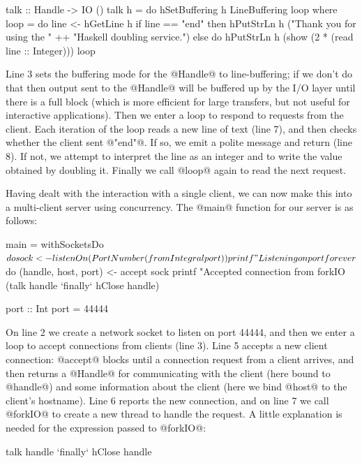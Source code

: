 \begin{numhaskell}
talk :: Handle -> IO ()
talk h = do
  hSetBuffering h LineBuffering
  loop
 where
  loop = do
    line <- hGetLine h
    if line == "end"
       then hPutStrLn h ("Thank you for using the " ++
                         "Haskell doubling service.")
       else do hPutStrLn h (show (2 * (read line :: Integer)))
               loop
\end{numhaskell}

\noindent Line 3 sets the buffering mode for the @Handle@ to
line-buffering; if we don't do that then output sent to the @Handle@
will be buffered up by the I/O layer until there is a full block
(which is more efficient for large transfers, but not useful for
interactive applications).  Then we enter a loop to respond to
requests from the client.  Each iteration of the loop reads a new line
of text (line 7), and then checks whether the client sent @"end"@.  If
so, we emit a polite message and return (line 8).  If not, we attempt
to interpret the line as an integer and to write the value obtained by
doubling it.  Finally we call @loop@ again to read the next request.

Having dealt with the interaction with a single client, we can now
make this into a multi-client server using concurrency.  The @main@
function for our server is as follows:

\begin{numhaskell}
main = withSocketsDo $ do
  sock <- listenOn (PortNumber (fromIntegral port))
  printf "Listening on port %
  forever $ do
     (handle, host, port) <- accept sock
     printf "Accepted connection from %
     forkIO (talk handle `finally` hClose handle)

port :: Int
port = 44444
\end{numhaskell}

\noindent On line 2 we create a network socket to listen on port
44444, and then we enter a loop to accept connections from clients
(line 3).  Line 5 accepts a new client connection: @accept@ blocks
until a connection request from a client arrives, and then returns a
@Handle@ for communicating with the client (here bound to @handle@) and
some information about the client (here we bind @host@ to the client's
hostname).  Line 6 reports the new connection, and on line 7 we call
@forkIO@ to create a new thread to handle the request.  A little
explanation is needed for the expression passed to @forkIO@:

\begin{haskell}
   talk handle `finally` hClose handle
\end{haskell}

